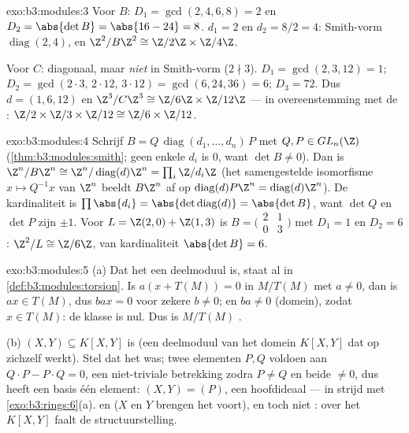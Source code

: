 \begin{solution}{exo:b3:modules:3}
Voor $B$: $D_1 = \gcd(2,4,6,8) = 2$ en $D_2 = \abs{\det B} =
\abs{16 - 24} = 8$.  $d_1 = 2$ en $d_2 = 8/2 =
4$: Smith-vorm $\operatorname{diag}(2, 4)$, en $\Z^2/B\Z^2 \cong
\Z/2\Z \times \Z/4\Z$.

Voor $C$: diagonaal, maar \emph{niet} in Smith-vorm ($2 \nmid 3$).
$D_1 = \gcd(2,3,12) = 1$; $D_2 = \gcd(2\cdot3,\, 2\cdot12,\,
3\cdot12) = \gcd(6, 24, 36) = 6$; $D_3 = 72$. Dus $d = (1, 6, 12)$
en $\Z^3/C\Z^3 \cong \Z/6\Z\times\Z/12\Z$ --- in overeenstemming
met de : $\Z/2\times\Z/3\times\Z/12 \cong
\Z/6\times\Z/12$.
\end{solution}

\begin{solution}{exo:b3:modules:4}
Schrijf $B = Q\,\operatorname{diag}(d_1, \dots, d_n)\,P$ met $Q, P
\in GL_n(\Z)$ (\cref{thm:b3:modules:smith}; geen enkele $d_i$ is
$0$, want $\det B \neq 0$). Dan is $\Z^n/B\Z^n \cong \Z^n/
\operatorname{diag}(d)\Z^n = \prod_i \Z/d_i\Z$ (het samengestelde
isomorfisme $x \mapsto Q^{-1}x$ van $\Z^n$ beeldt $B\Z^n$ af op
$\operatorname{diag}(d)P\Z^n = \operatorname{diag}(d)\Z^n$). De
kardinaliteit is $\prod \abs{d_i} = \abs{\det
\operatorname{diag}(d)} = \abs{\det B}$, want $\det Q$ en $\det P$
zijn $\pm 1$. Voor $L = \Z(2,0) + \Z(1,3)$ is $B =
\bigl(\begin{smallmatrix}2 & 1\\ 0 & 3\end{smallmatrix}\bigr)$ met
$D_1 = 1$ en $D_2 = 6$: $\Z^2/L \cong \Z/6\Z$, van kardinaliteit
$\abs{\det B} = 6$.
\end{solution}

\begin{solution}{exo:b3:modules:5}
(a) Dat het een deelmoduul is, staat al in
\cref{def:b3:modules:torsion}. Is $a(x + T(M)) = 0$ in $M/T(M)$
met $a \neq 0$, dan is $ax \in T(M)$, dus $bax = 0$ voor zekere $b
\neq 0$; en $ba \neq 0$ (domein), zodat $x \in T(M)$: de klasse is
nul. Dus is $M/T(M)$ .

(b) $(X, Y) \subseteq K[X,Y]$ is  (een deelmoduul van
het domein $K[X,Y]$ dat op zichzelf werkt). Stel dat het  was;
twee elementen $P, Q$ voldoen aan $Q\cdot P - P \cdot Q = 0$, een
niet-triviale betrekking zodra $P \ne Q$ en beide $\neq 0$, dus
heeft een basis één element: $(X, Y) = (P)$, een hoofdideaal ---
in strijd met \cref{exo:b3:rings:6}(a).  en  ($X$ en $Y$ brengen het voort), en toch niet :
over het  $K[X,Y]$ faalt de
structuurstelling.
\end{solution}

